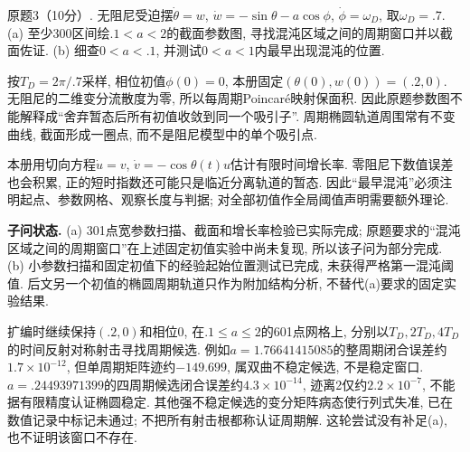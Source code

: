 \begin{exercise}
原题3（10分）. 无阻尼受迫摆$\dot\theta=w$, $\dot w=-\sin\theta-a\cos\phi$, $\dot\phi=\omega_D$, 取$\omega_D=.7$. (a) 至少300区间绘$.1<a<2$的截面参数图, 寻找混沌区域之间的周期窗口并以截面佐证. (b) 细查$0<a<.1$, 并测试$0<a<1$内最早出现混沌的位置.
\end{exercise}
\begin{solution}
按$T_D=2\pi/.7$采样, 相位初值$\phi(0)=0$, 本册固定$(\theta(0),w(0))=(.2,0)$. 无阻尼的二维变分流散度为零, 所以每周期Poincaré映射保面积. 因此原题参数图不能解释成“舍弃暂态后所有初值收敛到同一个吸引子”. 周期椭圆轨道周围常有不变曲线, 截面形成一圈点, 而不是阻尼模型中的单个吸引点.

本册用切向方程$\dot u=v$, $\dot v=-\cos\theta(t)u$估计有限时间增长率. 零阻尼下数值误差也会积累, 正的短时指数还可能只是临近分离轨道的暂态. 因此“最早混沌”必须注明起点、参数网格、观察长度与判据; 对全部初值作全局阈值声明需要额外理论.

\textbf{子问状态.} (a) 301点宽参数扫描、截面和增长率检验已实际完成; 原题要求的“混沌区域之间的周期窗口”在上述固定初值实验中尚未复现, 所以该子问为部分完成. (b) 小参数扫描和固定初值下的经验起始位置测试已完成, 未获得严格第一混沌阈值. 后文另一个初值的椭圆周期轨道只作为附加结构分析, 不替代(a)要求的固定实验结果.

扩编时继续保持$(.2,0)$和相位0, 在$.1\le a\le2$的601点网格上, 分别以$T_D,2T_D,4T_D$的时间反射对称射击寻找周期候选. 例如$a=1.76641415085$的整周期闭合误差约$1.7\times10^{-12}$, 但单周期矩阵迹约$-149.699$, 属双曲不稳定候选, 不是稳定窗口. $a=.24493971399$的四周期候选闭合误差约$4.3\times10^{-14}$, 迹离2仅约$2.2\times10^{-7}$, 不能据有限精度认证椭圆稳定. 其他强不稳定候选的变分矩阵病态使行列式失准, 已在数值记录中标记未通过; 不把所有射击根都称认证周期解. 这轮尝试没有补足(a), 也不证明该窗口不存在.

\end{solution}


